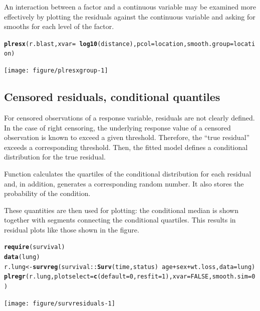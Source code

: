 \documentclass[11pt]{article}\usepackage[]{graphicx}\usepackage[]{color}
\makeatletter
\newcommand{\hlnum}[1]{\textcolor[rgb]{0.686,0.059,0.569}{#1}}%
\newcommand{\hlopt}[1]{\textcolor[rgb]{0,0,0}{#1}}%
\newcommand{\hlstd}[1]{\textcolor[rgb]{0.345,0.345,0.345}{#1}}%
\newcommand{\hlkwb}[1]{\textcolor[rgb]{0.69,0.353,0.396}{#1}}%
\newcommand{\hlkwc}[1]{\textcolor[rgb]{0.333,0.667,0.333}{#1}}%
\newcommand{\hlkwd}[1]{\textcolor[rgb]{0.737,0.353,0.396}{\textbf{#1}}}%
\newenvironment{kframe}{%
 \def\at@end@of@kframe{}%
 \ifinner\ifhmode%
  \def\at@end@of@kframe{\end{minipage}}%
  \begin{minipage}{\columnwidth}%
 \fi\fi%
 \def\FrameCommand##1{\hskip\@totalleftmargin \hskip-\fboxsep
 \colorbox{shadecolor}{##1}\hskip-\fboxsep
     \hskip-\linewidth \hskip-\@totalleftmargin \hskip\columnwidth}%
 \MakeFramed {\advance\hsize-\width
   \@totalleftmargin\z@ \linewidth\hsize
   \@setminipage}}%
 {\par\unskip\endMakeFramed%
 \at@end@of@kframe}
\newenvironment{knitrout}{}{} %
\makeatother
\begin{document}
An interaction between a factor and a continuous variable may be examined
more effectively by plotting the residuals against the continuous variable
and asking for smooths for each level of the factor.

\begin{knitrout}
\color{fgcolor}\begin{kframe}
\begin{alltt}
\hlkwd{plresx}\hlstd{(r.blast,} \hlkwc{xvar}\hlstd{=}\hlopt{~} \hlkwd{log10}\hlstd{(distance),} \hlkwc{pcol}\hlstd{=location,} \hlkwc{smooth.group}\hlstd{=location)}
\end{alltt}
\end{kframe}
\texttt{[image: figure/plresxgroup-1]} 

\end{knitrout}

\subsection{Censored residuals, conditional quantiles}

For censored observations of a response variable, residuals are not 
clearly defined.
In the case of right censoring, the underlying response value of a censored
observation is known to exceed a given threshold. Therefore, the 
``true residual'' exceeds a corresponding threshold.
Then, the fitted model defines a conditional distribution for the true residual.


Function  calculates the quartiles of the conditional
distribution for each residual and, in addition, generates a corresponding
random number. It also stores the probability of the condition.

These quantities are then used for plotting: the conditional median is 
shown together with segments connecting the conditional quartiles.
This results in residual plots like those shown in the figure.

\begin{knitrout}
\color{fgcolor}\begin{kframe}
\begin{alltt}
\hlkwd{require}\hlstd{(survival)}
\hlkwd{data}\hlstd{(lung)}
\hlstd{r.lung} \hlkwb{<-} \hlkwd{survreg}\hlstd{(survival}\hlopt{::}\hlkwd{Surv}\hlstd{(time,status)} \hlopt{~} \hlstd{age}\hlopt{+}\hlstd{sex}\hlopt{+}\hlstd{wt.loss,} \hlkwc{data}\hlstd{=lung)}
\hlkwd{plregr}\hlstd{(r.lung,} \hlkwc{plotselect}\hlstd{=}\hlkwd{c}\hlstd{(}\hlkwc{default}\hlstd{=}\hlnum{0}\hlstd{,} \hlkwc{resfit}\hlstd{=}\hlnum{1}\hlstd{),} \hlkwc{xvar}\hlstd{=}\hlnum{FALSE}\hlstd{,} \hlkwc{smooth.sim}\hlstd{=}\hlnum{0}\hlstd{)}
\end{alltt}
\end{kframe}
\texttt{[image: figure/survresiduals-1]} 

\end{knitrout}
\end{document}
